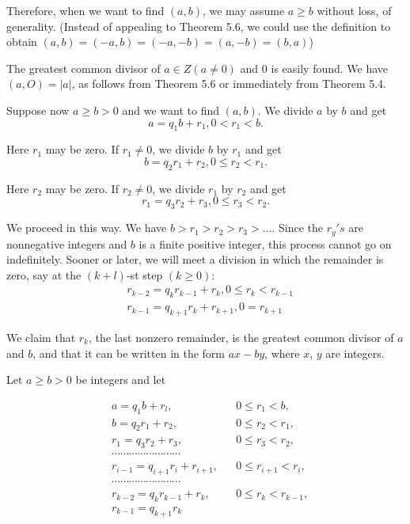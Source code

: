 \documentclass[11pt]{amsbook}
\begin{document}
    
    Therefore, when we want to find $(a,b)$, we may assume $a \geqslant b$ without loss, of generality. (Instead of appealing to Theorem 5.6, we could use the definition to obtain $(a,b) = (-a,b) = (-a,-b) = (a,-b) = (b,a)$)
    
    The greatest common divisor of $a \in Z (a \ne 0)$ and $0$ is easily found. We have $(a,O) = \left | a \right \vert$, as follows from Theorem 5.6 or immediately from Theorem 5.4.
    
    Suppose now $a \geqslant b > 0$ and we want to find $(a,b)$. We divide $a$ by $b$ and get
    \[
        a = q_1 b + r_1 , 0 < r_1 < b. 
    \]
    
    Here $r_1$ may be zero. If $r_1 \ne 0$, we divide $b$ by $r_1$ and get 
    \[
        b = q_2 r_1 + r_2 , 0 \le r_2 < r_1. 
    \]
        
    Here $r_2$ may be zero. If $r_2 \ne 0$, we divide $r_1$ by $r_2$ and get 
    \[
        r_1 = q_3 r_2 + r_3 , 0 \le r_3 < r_2. 
    \]
    
    We proceed in this way. We have $b > r_1 > r_2 > r_3 > \dots$. Since the $r_y 's$ are nonnegative integers and $b$ is a finite positive integer, this process cannot go on indefinitely. Sooner or later, we will meet a division in which the remainder is zero, say at the $(k+l)$-st step $(k \ge 0)$:
    \begin{align*}
        &r_{k-2} = q_k r_{k-1} + r_k , 0 \le r_k < r_{k-1}  \\
        &r_{k-1} = q_{k+1} r_{k} + r_{k+1} , 0 = r_{k+1}
    \end{align*}
    
    We claim that $r_k$, the last nonzero remainder, is the greatest common divisor of $a$ and $b$, and that it can be written in the form $ax - by$, where $x$, $y$ are integers.
    
    \begin{thm}
        Let $a \ge b > 0$ be integers and let
        
        \begin{align*}
        &a = q_1 b + r_l,       &   &0 \le r_1 < b,      \\
        &b = q_2 r_1 + r_2,     &   &0 \le r_2 < r_1,    \\
        &r_1 = q_3 r_2 + r_3,   &   &0 \le r_3 < r_2,    \\
        &\cdots\cdots\cdots\cdots\cdots\cdots\cdots\cdots   \\
        &r_{i-1} = q_{i+1} r_i + r_{i+1},   &   &0 \le r_{i+1} < r_i,    \\
        &\cdots\cdots\cdots\cdots\cdots\cdots\cdots\cdots   \\
        &r_{k-2} = q_k r_{k-1} + r_k,   &   &0 \le r_k < r_{k-1},      \\
        &r_{k-1} = q_{k+1} r_{k}
        \end{align*}
    \end{thm}
\end{document}
